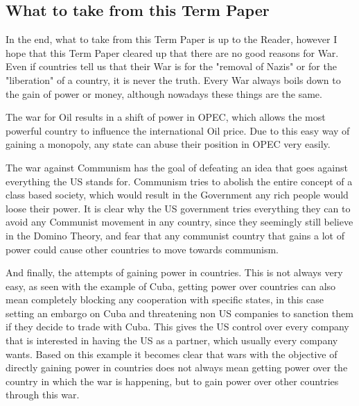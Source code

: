 \subsection{What to take from this Term Paper}
In the end, what to take from this Term Paper is up to the Reader, however I hope that this Term Paper cleared up that there are no good reasons for War. Even if countries tell us that their War is for the "removal of Nazis" or for the "liberation" of a country, it is never the truth. Every War always boils down to the gain of power or money, although nowadays these things are the same.

The war for Oil results in a shift of power in OPEC, which allows the most powerful country to influence the international Oil price. Due to this easy way of gaining a monopoly, any state can abuse their position in OPEC very easily.

The war against Communism has the goal of defeating an idea that goes against everything the US stands for. Communism tries to abolish the entire concept of a class based society, which would result in the Government any rich people would loose their power. It is clear why the US government tries everything they can to avoid any Communist movement in any country, since they seemingly still believe in the Domino Theory, and fear that any communist country that gains a lot of power could cause other countries to move towards communism.

And finally, the attempts of gaining power in countries. This is not always very easy, as seen with the example of Cuba, getting power over countries can also mean completely blocking any cooperation with specific states, in this case setting an embargo on Cuba and threatening non US companies to sanction them if they decide to trade with Cuba. This gives the US control over every company that is interested in having the US as a partner, which usually every company wants. Based on this example it becomes clear that wars with the objective of directly gaining power in countries does not always mean getting power over the country in which the war is happening, but to gain power over other countries through this war.
